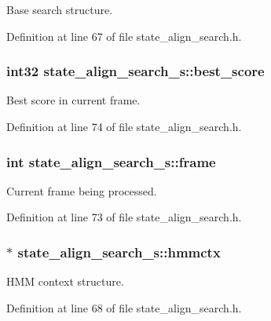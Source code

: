 Base search structure. 



Definition at line 67 of file state\+\_\+align\+\_\+search.\+h.

\subsubsection[{best\+\_\+score}]{\setlength{\rightskip}{0pt plus 5cm}int32 state\+\_\+align\+\_\+search\+\_\+s\+::best\+\_\+score}\label{structstate__align__search__s_a1810f343c6ae382f5ed0a5eb02d33037}


Best score in current frame. 



Definition at line 74 of file state\+\_\+align\+\_\+search.\+h.

\subsubsection[{frame}]{\setlength{\rightskip}{0pt plus 5cm}int state\+\_\+align\+\_\+search\+\_\+s\+::frame}\label{structstate__align__search__s_aa520abfdb4d0bca2b769f281839637a9}


Current frame being processed. 



Definition at line 73 of file state\+\_\+align\+\_\+search.\+h.

\subsubsection[{hmmctx}]{$\ast$ state\+\_\+align\+\_\+search\+\_\+s\+::hmmctx}\label{structstate__align__search__s_a683e76dbcc87cde89ca5d45b4b91c1e9}


H\+M\+M context structure. 



Definition at line 68 of file state\+\_\+align\+\_\+search.\+h.

